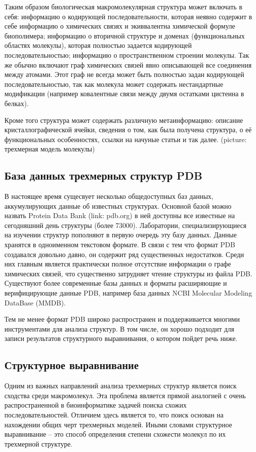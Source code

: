 \documentclass[a4paper, 12pt, titlepage, utf8]{extarticle}
\begin{document}
Таким образом биологическая макромолекулярная структура может включать в себя: информацию о кодирующей последовательности, которая неявно содержит в себе информацию о химических связях и экиввалентна химической формуле биополимера; информацию о вторичной структуре и доменах (функциональных областях молекулы), которая полностью задается кодирующей последовательностью; информацию о пространственном строении молекулы. Так же обычно включают граф химических связей явно описывающей все соединения между атомами. 
Этот граф не всегда может быть полностью задан кодирующей последовательностью, так как молекула может содержать нестандартные модификации (например ковалентные связи между двумя остатками цистеина в белках).

Кроме того структура может содержать различную метаинформацию: описание кристаллографической ячейки, сведения о том, как была получена структура, о её функциональных особенностях, ссылки на начуные статьи и так далее.
(picture: трехмерная модель молекулы)

\subsection{База данных трехмерных структур PDB}
В настоящее время сущесвует несколько общедоступных баз данных, аккумулирующих данные об известных структурах. Основной базой можно назвать Protein Data Bank (link: pdb.org) в ней доступны все известные на сегодняшний день структуры (более 73000). Лаборатории, специализирующиеся на изучении структур пополняют в первую очередь эту базу данных. Данные хранятся в одноименном текстовом формате. В связи с тем что формат PDB создавался довольно давно, он содержит ряд существенных недостатков. Среди них главным является практически полное отсутствие информации о графе химических связей, что существенно затрудняет чтение структуры из файла PDB. Существуют более современные базы данных и форматы расширяющие и верифицирующие данные PDB, например база данных NCBI Molecular
Modeling DataBase (MMDB). 

Тем не менее формат PDB широко распространен и поддерживается многими инструментами для анализа структур. В том числе, он хорошо подходит для записи результатов структурного выравнивания, о котором пойдет речь ниже.

\subsection{Структурное выравнивание}
Одним из важных направлений анализа трехмерных структур является поиск сходства среди макромолекул. Эта проблема является прямой аналогией с очень распространенной в биоинформатике задачей поиска схожих последовательностей. Отличием здесь является то, что поиск основан на нахождении общих черт трехмерных моделей. Иными словами структурное выравнивание -- это способ определения степени схожести молекул по их трехмерной структуре.
\end{document}
